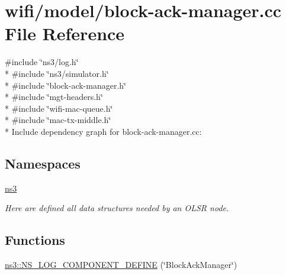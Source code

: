 \hypertarget{block-ack-manager_8cc}{}\section{wifi/model/block-\/ack-\/manager.cc File Reference}
\label{block-ack-manager_8cc}
{\ttfamily \#include \char`\"{}ns3/log.\+h\char`\"{}}\\*
{\ttfamily \#include \char`\"{}ns3/simulator.\+h\char`\"{}}\\*
{\ttfamily \#include \char`\"{}block-\/ack-\/manager.\+h\char`\"{}}\\*
{\ttfamily \#include \char`\"{}mgt-\/headers.\+h\char`\"{}}\\*
{\ttfamily \#include \char`\"{}wifi-\/mac-\/queue.\+h\char`\"{}}\\*
{\ttfamily \#include \char`\"{}mac-\/tx-\/middle.\+h\char`\"{}}\\*
Include dependency graph for block-\/ack-\/manager.cc\+:
\subsection*{Namespaces}
\begin{DoxyCompactItemize}
\item 
 \hyperlink{namespacens3}{ns3}
\begin{DoxyCompactList}\small\item\em Here are defined all data structures needed by an O\+L\+SR node. \end{DoxyCompactList}\end{DoxyCompactItemize}
\subsection*{Functions}
\begin{DoxyCompactItemize}
\item 
\hyperlink{namespacens3_a972b39baee814255b648e6e7f2c500ab}{ns3\+::\+N\+S\+\_\+\+L\+O\+G\+\_\+\+C\+O\+M\+P\+O\+N\+E\+N\+T\+\_\+\+D\+E\+F\+I\+NE} (\char`\"{}Block\+Ack\+Manager\char`\"{})
\end{DoxyCompactItemize}
